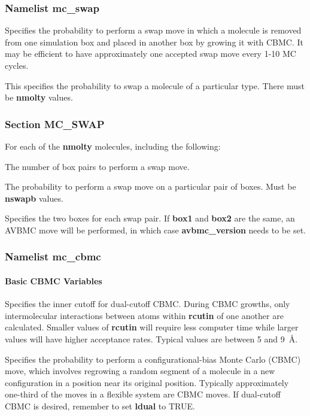 \documentclass[12pt,letterpaper]{article}
\begin{document}
\subsubsection{Namelist \textbf{mc\_swap}}
 Specifies the probability to perform
a swap move in which a molecule is removed from one
simulation box and placed in another box by growing it with
CBMC. It may be efficient to have approximately one accepted
swap move every 1-10 MC cycles.

 This specifies the probability to
swap a molecule of a particular type. There must be {\bf
  nmolty} values.

\subsubsection{Section \textbf{MC\_SWAP}}
For each of the \textbf{nmolty} molecules, including the following:

 The number of box pairs to perform a
swap move.

 The probability to perform a swap
move on a particular pair of boxes. Must be {\bf nswapb}
values.

 Specifies the two boxes for each
swap pair. If {\bf box1} and {\bf box2} are the same, an
AVBMC move will be performed, in which case
\textbf{avbmc\_version} needs to be set.

\subsubsection{Namelist \textbf{mc\_cbmc}}
\paragraph{Basic CBMC Variables}

 Specifies the inner cutoff for
dual-cutoff CBMC. During CBMC growths, only intermolecular
interactions between atoms within {\bf rcutin} of one
another are calculated. Smaller values of {\bf rcutin} will
require less computer time while larger values will have
higher acceptance rates. Typical values are between 5 and
9~\AA.

 Specifies the probability to perform a
configurational-bias Monte Carlo (CBMC) move, which involves
regrowing a random segment of a molecule in a new
configuration in a position near its original position.
Typically approximately one-third of the moves in a flexible
system are CBMC moves. If dual-cutoff CBMC is desired,
remember to set {\bf ldual} to TRUE.
\end{document}
